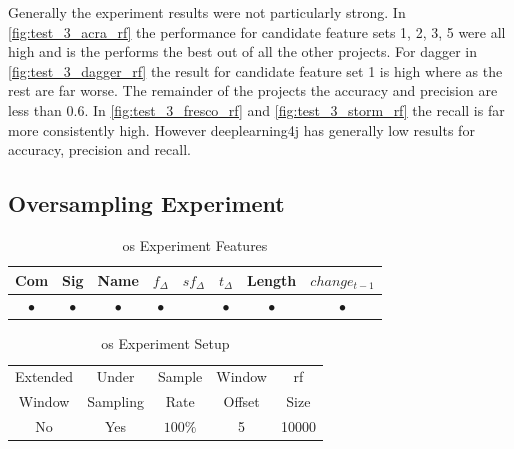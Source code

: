 Generally the experiment results were not particularly strong. In \autoref{fig:test_3_acra_rf} the performance for candidate feature sets 1, 2, 3, 5 were all high and is the performs the best out of all the other projects. For dagger in \autoref{fig:test_3_dagger_rf} the result for candidate feature set 1 is high where as the rest are far worse. The remainder of the projects the accuracy and precision are less than $0.6$. In \autoref{fig:test_3_fresco_rf} and \autoref{fig:test_3_storm_rf} the recall is far more consistently high. However deeplearning4j has generally low results for accuracy, precision and recall.

\subsection{Oversampling Experiment}

\begin{table}[h]
\begin{center}

    \begin{tabular}{|c|c|c|c|c|c|c|c|}
        \hline
        Com & Sig & Name & $f_{\Delta}$ & $sf_{\Delta}$ & $t_\Delta$ & Length & $change_{t-1}$ \\
         \hline
        $\bullet$ & $\bullet$ & $\bullet$ & $\bullet$ & & $\bullet$ & $\bullet$ & $\bullet$ \\ \hline
    \end{tabular}
    \caption{\gls{os} Experiment Features}
    \label{tab:rf_oversampling_features}
\end{center}

\end{table}

\begin{table}[h]
\begin{center}

    \begin{tabular}{|c|c|c|c|c|}
        \hline
        Extended & Under & Sample & Window & \gls{rf} \\
        Window & Sampling & Rate & Offset & Size \\ \hline
        No & Yes & $100\%$ & 5 & 10000 \\ \hline
    \end{tabular}
    \caption{\gls{os} Experiment Setup}
    \label{tab:rf_os_experiment_setup}
\end{center}

\end{table}


